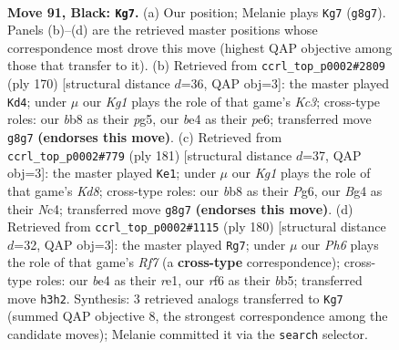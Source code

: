 \documentclass[11pt]{article}
\begin{document}
\clearpage

\begin{figure}[p]\centering
\begin{subfigure}{0.46\textwidth}\centering
\resizebox{\linewidth}{!}{%
\newchessgame
\chessboard[
  setfen={1B4k1/8/1P3R2/3N4/P3B1b1/1K5p/8/6r1 b - - 4 91},
  showmover=false,
  pgfstyle=straightmove, color=movearrow, markmove={g8-g7}
]}
\caption{}
\end{subfigure}\hfill
\begin{subfigure}{0.46\textwidth}\centering
\resizebox{\linewidth}{!}{%
\newchessgame
\chessboard[
  setfen={2R5/4k3/4p1b1/2P1n1p1/B7/2K5/8/8 w - - 7 86},
  showmover=false,
  pgfstyle=straightmove, color=movearrow, markmove={c3-d4}
]}
\caption{}
\end{subfigure}
\\[4pt]
\begin{subfigure}{0.46\textwidth}\centering
\resizebox{\linewidth}{!}{%
\newchessgame
\chessboard[
  setfen={8/3r3p/6p1/8/2n2B2/7P/R5PK/3k4 b - - 55 91},
  showmover=false,
  pgfstyle=straightmove, color=movearrow, markmove={d1-e1}
]}
\caption{}
\end{subfigure}\hfill
\begin{subfigure}{0.46\textwidth}\centering
\resizebox{\linewidth}{!}{%
\newchessgame
\chessboard[
  setfen={8/5R2/p7/1b3P1p/3K3k/1B6/8/4r3 w - - 0 91},
  showmover=false,
  pgfstyle=straightmove, color=movearrow, markmove={f7-g7}
]}
\caption{}
\end{subfigure}
\caption{\textbf{Move 91, Black: \texttt{Kg7}.} (a) Our position; Melanie plays \texttt{Kg7} (\texttt{g8g7}). Panels (b)--(d) are the retrieved master positions whose correspondence most drove this move (highest QAP objective among those that transfer to it). (b) Retrieved from \texttt{ccrl\_top\_p0002\#2809} (ply 170) [structural distance $d$=36, QAP obj=3]: the master played \texttt{Kd4}; under $\mu$ our \emph{Kg1} plays the role of that game's \emph{Kc3}; cross-type roles: our \emph{b}b8 as their \emph{p}g5, our \emph{b}e4 as their \emph{p}e6; transferred move \texttt{g8g7} \textbf{(endorses this move)}. (c) Retrieved from \texttt{ccrl\_top\_p0002\#779} (ply 181) [structural distance $d$=37, QAP obj=3]: the master played \texttt{Ke1}; under $\mu$ our \emph{Kg1} plays the role of that game's \emph{Kd8}; cross-type roles: our \emph{b}b8 as their \emph{P}g6, our \emph{B}g4 as their \emph{N}c4; transferred move \texttt{g8g7} \textbf{(endorses this move)}. (d) Retrieved from \texttt{ccrl\_top\_p0002\#1115} (ply 180) [structural distance $d$=32, QAP obj=3]: the master played \texttt{Rg7}; under $\mu$ our \emph{Ph6} plays the role of that game's \emph{Rf7} (a \textbf{cross-type} correspondence); cross-type roles: our \emph{b}e4 as their \emph{r}e1, our \emph{r}f6 as their \emph{b}b5; transferred move \texttt{h3h2}. Synthesis: 3 retrieved analogs transferred to \texttt{Kg7} (summed QAP objective 8, the strongest correspondence among the candidate moves); Melanie committed it via the \texttt{search} selector.}
\label{fig:thought-m181}
\end{figure}
\end{document}

